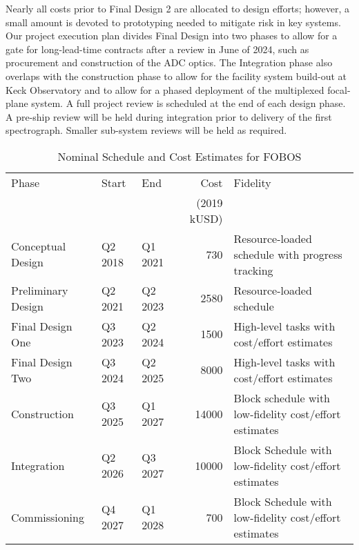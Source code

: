 Nearly all costs prior to Final Design 2 are allocated to design
efforts; however, a small amount is devoted to prototyping needed to
mitigate risk in key systems.  Our project execution plan divides Final
Design into two phases to allow for a gate for long-lead-time contracts
after a review in June of 2024, such as procurement and construction of
the ADC optics.  The Integration phase also overlaps with the
construction phase to allow for the facility system build-out at Keck
Observatory and to allow for a phased deployment of the multiplexed
focal-plane system.  A full project review is scheduled at the end of
each design phase.  A pre-ship review will be held during integration
prior to delivery of the first spectrograph.   Smaller sub-system
reviews will be held as required.

\begin{table}[h!]
\centering
\footnotesize
\caption{Nominal Schedule and Cost Estimates for FOBOS}
\label{tab:cost}
\vspace*{-10pt}
\begin{tabular}{l | l l r l }
\hline
Phase              &  Start  &     End &         Cost & Fidelity \\
                   &         &         &  (2019 kUSD) &  \\
\hline
\hline
Conceptual Design  & Q2 2018 & Q1 2021 &   730 & Resource-loaded schedule with progress tracking \\
Preliminary Design & Q2 2021 & Q2 2023 &  2580 & Resource-loaded schedule \\
Final Design One   & Q3 2023 & Q2 2024 &  1500 & High-level tasks with cost/effort estimates \\
Final Design Two   & Q3 2024 & Q2 2025 &  8000 & High-level tasks with cost/effort estimates \\
Construction       & Q3 2025 & Q1 2027 & 14000 & Block schedule with low-fidelity cost/effort estimates \\
Integration        & Q2 2026 & Q3 2027 & 10000 & Block Schedule with low-fidelity cost/effort estimates \\
Commissioning      & Q4 2027 & Q1 2028 &   700 & Block Schedule with low-fidelity cost/effort estimates \\
\hline
\end{tabular}
\end{table}









